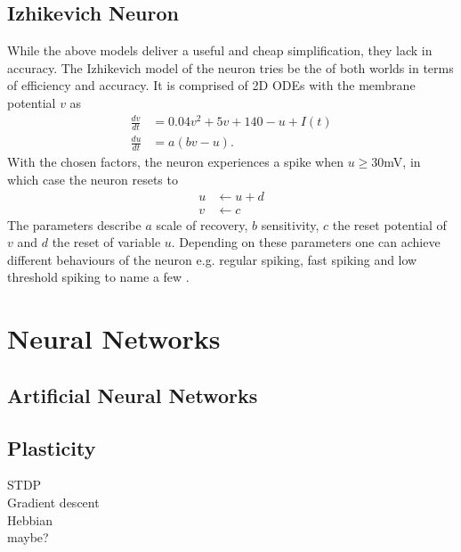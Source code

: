 \subsection{Izhikevich Neuron}
While the above models deliver a useful and cheap simplification, they lack in accuracy. The Izhikevich model \cite{izhikevich_simple_2003} of the neuron tries be the of both worlds in terms of efficiency and accuracy. It is comprised of 2D ODEs with the membrane potential $v$ as
\begin{equation}
	\begin{aligned}
	\frac{d v}{dt} &= 0.04v^2 + 5v + 140 -u +I(t)\\
	\frac{d u}{dt} &= a(bv-u).
	\end{aligned}
\end{equation}
With the chosen factors, the neuron experiences a spike when $u\geq30 $mV, in which case the neuron resets to
\begin{equation}
\begin{aligned}
	u &\leftarrow u+d\\
	v&\leftarrow c
\end{aligned}
\end{equation}
The parameters describe $a$ scale of recovery, $b$ sensitivity, $c$ the reset potential of $v$ and $d$ the reset of variable $u$. Depending on these parameters one can achieve different behaviours of the neuron e.g. regular spiking, fast spiking and low threshold spiking to name a few \cite{izhikevich_simple_2003}.

\section{Neural Networks}

\subsection{Artificial Neural Networks}


 \subsection{Plasticity}
 STDP\\
 Gradient descent\\
 Hebbian\\
 maybe?

